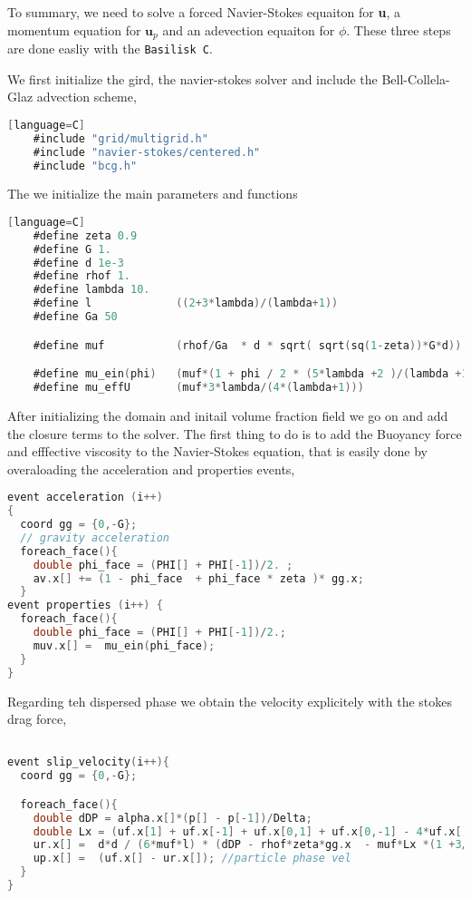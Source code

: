 To summary, we need to solve a forced Navier-Stokes equaiton for \textbf{u}, a momentum equation for $\textbf{u}_p$ and an adevection equaiton for $\phi$. 
These three steps are done easliy with the \texttt{Basilisk C}. 

We first initialize the gird, the navier-stokes solver and include the Bell-Collela-Glaz advection scheme,  
\begin{lstlisting}[language=C][language=C]
    #include "grid/multigrid.h"
    #include "navier-stokes/centered.h"
    #include "bcg.h"
\end{lstlisting}

The we initialize the main parameters and functions 
\begin{lstlisting}[language=C][language=C]
    #define zeta 0.9
    #define G 1. 
    #define d 1e-3
    #define rhof 1. 
    #define lambda 10.
    #define l             ((2+3*lambda)/(lambda+1))
    #define Ga 50

    #define muf           (rhof/Ga  * d * sqrt( sqrt(sq(1-zeta))*G*d))

    #define mu_ein(phi)   (muf*(1 + phi / 2 * (5*lambda +2 )/(lambda +1) ) )
    #define mu_effU       (muf*3*lambda/(4*(lambda+1)))
\end{lstlisting}


After initializing the domain and initail volume fraction field we go on and add the closure terms to the solver. 
The first thing to do is to add the Buoyancy force and efffective viscosity to the Navier-Stokes equation, that is easily done by overaloading the acceleration and properties events,  
\begin{lstlisting}[language=C]
event acceleration (i++)
{
  coord gg = {0,-G};
  // gravity acceleration 
  foreach_face(){
    double phi_face = (PHI[] + PHI[-1])/2. ; 
    av.x[] += (1 - phi_face  + phi_face * zeta )* gg.x; 
  }
event properties (i++) {
  foreach_face(){
    double phi_face = (PHI[] + PHI[-1])/2.;
    muv.x[] =  mu_ein(phi_face);
  }
}
\end{lstlisting}

Regarding teh dispersed phase we obtain the velocity explicitely with the stokes drag force, 
\begin{lstlisting}[language=C]

event slip_velocity(i++){
  coord gg = {0,-G};

  foreach_face(){
    double dDP = alpha.x[]*(p[] - p[-1])/Delta; 
    double Lx = (uf.x[1] + uf.x[-1] + uf.x[0,1] + uf.x[0,-1] - 4*uf.x[])/(Delta*Delta);
    ur.x[] =  d*d / (6*muf*l) * (dDP - rhof*zeta*gg.x  - muf*Lx *(1 +3/4*lambda/(lambda+1)) );
    up.x[] =  (uf.x[] - ur.x[]); //particle phase vel
  }  
}
\end{lstlisting}

